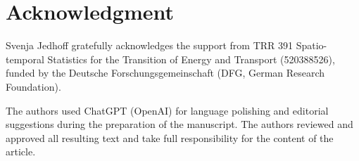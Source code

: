 \section{Acknowledgment}\label{acknowledgment}

Svenja Jedhoff gratefully acknowledges the support from TRR 391
Spatio-temporal Statistics for the Transition of Energy and Transport
(520388526), funded by the Deutsche Forschungsgemeinschaft (DFG, German
Research Foundation).

The authors used ChatGPT (OpenAI) for language polishing and editorial
suggestions during the preparation of the manuscript. The authors reviewed
and approved all resulting text and take full responsibility for the content
of the article.



\address{%
Paavo Sattler\\
TU Dortmund University, Department of Statistics\\%
44221 Dortmund, Germany\\
%
%
\textit{ORCiD: \href{https://orcid.org/0000-0001-8731-0893}{0000-0001-8731-0893}}\\%
\href{mailto:paavo.sattler@tu-dortmund.de}{\nolinkurl{paavo.sattler@tu-dortmund.de}}%
}

\address{%
Svenja Jedhoff\\
TU Dortmund University, Department of Statistics\\%
44221 Dortmund, Germany\\
%
%
\textit{ORCiD: \href{https://orcid.org/0009-0008-2939-9103}{0009-0008-2939-9103}}\\%
\href{mailto:svenja.jedhoff@tu-dortmund.de}{\nolinkurl{svenja.jedhoff@tu-dortmund.de}}%
}
